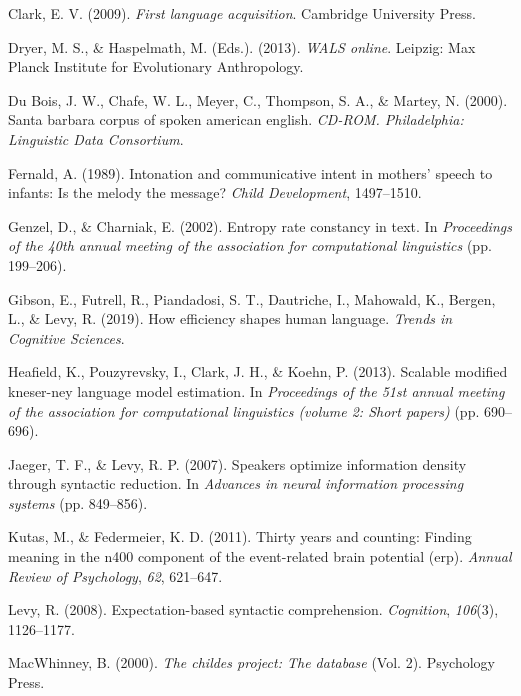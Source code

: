 \documentclass[10pt, letterpaper]{article}
\begin{document}
\leavevmode\hypertarget{ref-clark2009}{}%
Clark, E. V. (2009). \emph{First language acquisition}. Cambridge
University Press.

\leavevmode\hypertarget{ref-2013}{}%
Dryer, M. S., \& Haspelmath, M. (Eds.). (2013). \emph{WALS online}.
Leipzig: Max Planck Institute for Evolutionary Anthropology.

\leavevmode\hypertarget{ref-sbc}{}%
Du Bois, J. W., Chafe, W. L., Meyer, C., Thompson, S. A., \& Martey, N.
(2000). Santa barbara corpus of spoken american english. \emph{CD-ROM.
Philadelphia: Linguistic Data Consortium}.

\leavevmode\hypertarget{ref-fernald1989}{}%
Fernald, A. (1989). Intonation and communicative intent in mothers'
speech to infants: Is the melody the message? \emph{Child Development},
1497--1510.

\leavevmode\hypertarget{ref-genzel2002}{}%
Genzel, D., \& Charniak, E. (2002). Entropy rate constancy in text. In
\emph{Proceedings of the 40th annual meeting of the association for
computational linguistics} (pp. 199--206).

\leavevmode\hypertarget{ref-gibson2019}{}%
Gibson, E., Futrell, R., Piandadosi, S. T., Dautriche, I., Mahowald, K.,
Bergen, L., \& Levy, R. (2019). How efficiency shapes human language.
\emph{Trends in Cognitive Sciences}.

\leavevmode\hypertarget{ref-heafield2013}{}%
Heafield, K., Pouzyrevsky, I., Clark, J. H., \& Koehn, P. (2013).
Scalable modified kneser-ney language model estimation. In
\emph{Proceedings of the 51st annual meeting of the association for
computational linguistics (volume 2: Short papers)} (pp. 690--696).

\leavevmode\hypertarget{ref-jaeger2007}{}%
Jaeger, T. F., \& Levy, R. P. (2007). Speakers optimize information
density through syntactic reduction. In \emph{Advances in neural
information processing systems} (pp. 849--856).

\leavevmode\hypertarget{ref-kutas2011}{}%
Kutas, M., \& Federmeier, K. D. (2011). Thirty years and counting:
Finding meaning in the n400 component of the event-related brain
potential (erp). \emph{Annual Review of Psychology}, \emph{62},
621--647.

\leavevmode\hypertarget{ref-levy2008}{}%
Levy, R. (2008). Expectation-based syntactic comprehension.
\emph{Cognition}, \emph{106}(3), 1126--1177.

\leavevmode\hypertarget{ref-macwhinney2000}{}%
MacWhinney, B. (2000). \emph{The childes project: The database} (Vol.
2). Psychology Press.
\end{document}
